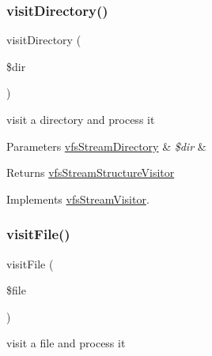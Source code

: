 \subsubsection{\texorpdfstring{visit\+Directory()}{visitDirectory()}}
{\footnotesize\ttfamily visit\+Directory (\begin{DoxyParamCaption}\item[{\mbox{\hyperlink{classorg_1_1bovigo_1_1vfs_1_1vfs_stream_directory}{vfs\+Stream\+Directory}}}]{\$dir }\end{DoxyParamCaption})}

visit a directory and process it


\begin{DoxyParams}[1]{Parameters}
\mbox{\hyperlink{classorg_1_1bovigo_1_1vfs_1_1vfs_stream_directory}{vfs\+Stream\+Directory}} & {\em \$dir} & \\
\hline
\end{DoxyParams}
\begin{DoxyReturn}{Returns}
\mbox{\hyperlink{classorg_1_1bovigo_1_1vfs_1_1visitor_1_1vfs_stream_structure_visitor}{vfs\+Stream\+Structure\+Visitor}} 
\end{DoxyReturn}


Implements \mbox{\hyperlink{interfaceorg_1_1bovigo_1_1vfs_1_1visitor_1_1vfs_stream_visitor_a58aba2b3abdff052e38254bba19aac72}{vfs\+Stream\+Visitor}}.

\mbox{\label{classorg_1_1bovigo_1_1vfs_1_1visitor_1_1vfs_stream_structure_visitor_aefbf1a8429cc874e03034c19eeba5a07}} 
\subsubsection{\texorpdfstring{visit\+File()}{visitFile()}}
{\footnotesize\ttfamily visit\+File (\begin{DoxyParamCaption}\item[{\mbox{\hyperlink{classorg_1_1bovigo_1_1vfs_1_1vfs_stream_file}{vfs\+Stream\+File}}}]{\$file }\end{DoxyParamCaption})}

visit a file and process it


